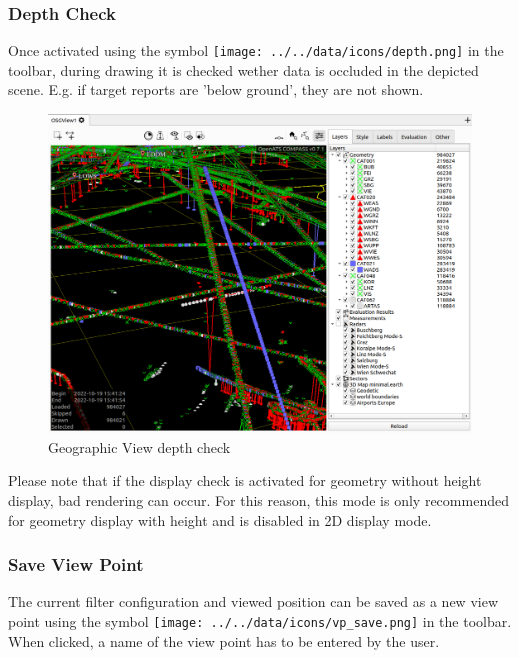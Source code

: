 \subsubsection{Depth Check}

Once activated using the symbol \texttt{[image: ../../data/icons/depth.png]} in the toolbar, during drawing it is checked wether data is occluded in the depicted scene. E.g. if target reports are 'below ground', they are not shown.

\begin{figure}[H]
    \hspace*{-2cm}
    \includegraphics[width=18cm,frame]{figures/geoview_depth_check.png}
  \caption{Geographic View depth check}
\end{figure}

Please note that if the display check is activated for geometry without height display, bad rendering can occur. For this reason, this mode is only recommended for geometry display with height and is disabled in 2D display mode.

\subsubsection{Save View Point}

The current filter configuration and viewed position can be saved as a new view point using the symbol \texttt{[image: ../../data/icons/vp\_save.png]} in the toolbar. When clicked, a name of the view point has to be entered by the user. 

